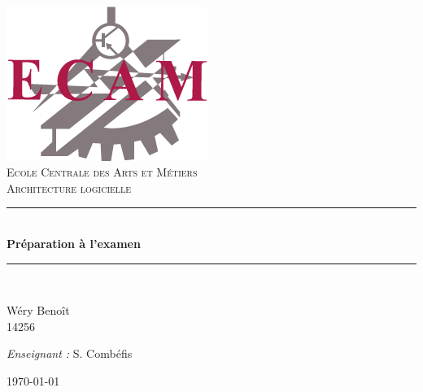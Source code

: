\setlength{\parindent}{0cm}
\setlength{\parskip}{1ex plus 0.5ex minus 0.2ex}
\newcommand{\hsp}{\hspace{20pt}}
\newcommand{\HRule}{\rule{\linewidth}{0.5mm}}

\begin{titlepage}
  \begin{sffamily}
  \begin{center}

	\hsp\\[2cm]
	\includegraphics[scale=0.3]{images/ecam-logo.png}~\\[1.5cm]
   \textsc{\LARGE Ecole Centrale des Arts et Métiers}\\[2.5cm]

    \textsc{\Large Architecture logicielle}\\[2cm]
%
    \HRule \\[0.4cm]
    { \huge \bfseries Préparation à l'examen\\[0.4cm] }

    \HRule \\[6cm]

    \begin{minipage}{0.4\textwidth}
      \begin{flushleft} \large
        Wéry Benoît\\
        14256\\
      \end{flushleft}
    \end{minipage}
    \begin{minipage}{0.4\textwidth}
      \begin{flushright} \large
        \textit{Enseignant :} S. Combéfis \\
      \end{flushright}
    \end{minipage}

    \vfill
%
    {\today}

  \end{center}
  \end{sffamily}
\end{titlepage}
